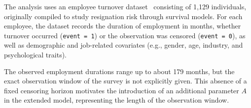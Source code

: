The analysis uses an employee turnover dataset~\cite{babushkin_employee_turnover} consisting of 1,129 individuals, originally compiled to study resignation risk through survival models. For each employee, the dataset records the duration of employment in months, whether turnover occurred (\texttt{event = 1}) or the observation was censored (\texttt{event = 0}), as well as demographic and job-related covariates (e.g., gender, age, industry, and psychological traits).

The observed employment durations range up to about 179 months, but the exact observation window of the survey is not explicitly given. This absence of a fixed censoring horizon motivates the introduction of an additional parameter $A$ in the extended model, representing the length of the observation window.